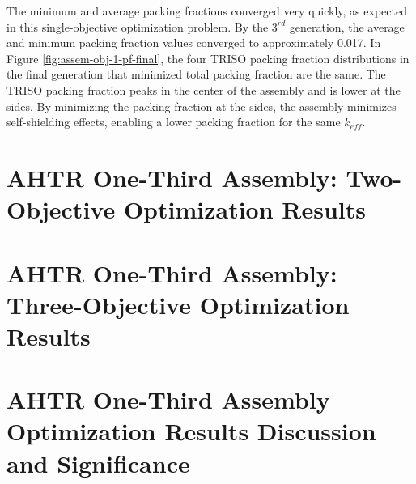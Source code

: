 The minimum and average packing fractions converged very quickly, as expected 
in this single-objective optimization problem.
By the $3^{rd}$ generation, the average and minimum packing fraction
values converged to approximately 0.017. 
In Figure \ref{fig:assem-obj-1-pf-final}, the four TRISO packing fraction distributions in the
final generation that minimized total packing fraction are the same.
The TRISO packing fraction peaks in the center of the assembly and is lower at the sides. 
By minimizing the packing fraction at the sides, the assembly minimizes self-shielding effects, 
enabling a lower packing fraction for the same $k_{eff}$. 

\section{AHTR One-Third Assembly: Two-Objective Optimization Results}

\section{AHTR One-Third Assembly: Three-Objective Optimization Results}

\section{AHTR One-Third Assembly Optimization Results Discussion and Significance}